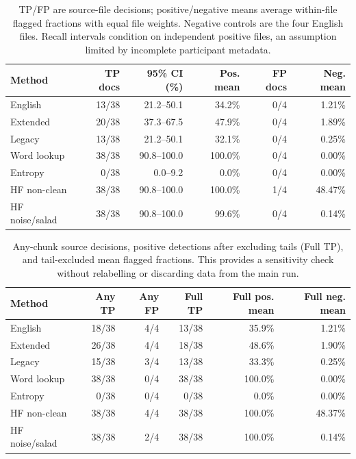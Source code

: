 \documentclass[10pt,a4paper,twocolumn]{article}
\begin{document}
\begin{table}[htbp]
\centering
\small
\caption{TP/FP are source-file decisions; positive/negative means average
within-file flagged fractions with equal file weights. Negative controls
are the four English files. Recall intervals condition on independent
positive files, an assumption limited by incomplete participant
metadata.}
\begin{tabular}{@{}lrrrrr@{}}
\toprule
Method & TP docs & 95\% CI (\%) & Pos. mean & FP docs & Neg. mean \\
\midrule
English & 13/38 & 21.2--50.1 & 34.2\% & 0/4 & 1.21\% \\
Extended & 20/38 & 37.3--67.5 & 47.9\% & 0/4 & 1.89\% \\
Legacy & 13/38 & 21.2--50.1 & 32.1\% & 0/4 & 0.25\% \\
Word lookup & 38/38 & 90.8--100.0 & 100.0\% & 0/4 & 0.00\% \\
Entropy & 0/38 & 0.0--9.2 & 0.0\% & 0/4 & 0.00\% \\
HF non-clean & 38/38 & 90.8--100.0 & 100.0\% & 1/4 & 48.47\% \\
HF noise/salad & 38/38 & 90.8--100.0 & 99.6\% & 0/4 & 0.14\% \\
\bottomrule
\end{tabular}
\end{table}

\begin{table}[htbp]
\centering
\small
\caption{Any-chunk source decisions, positive detections after excluding tails
(Full TP), and tail-excluded mean flagged fractions. This provides a
sensitivity check without relabelling or discarding data from the main
run.}
\begin{tabular}{@{}lrrrrr@{}}
\toprule
Method & Any TP & Any FP & Full TP & Full pos. mean & Full neg. mean \\
\midrule
English & 18/38 & 4/4 & 13/38 & 35.9\% & 1.21\% \\
Extended & 26/38 & 4/4 & 18/38 & 48.6\% & 1.90\% \\
Legacy & 15/38 & 3/4 & 13/38 & 33.3\% & 0.25\% \\
Word lookup & 38/38 & 0/4 & 38/38 & 100.0\% & 0.00\% \\
Entropy & 0/38 & 0/4 & 0/38 & 0.0\% & 0.00\% \\
HF non-clean & 38/38 & 4/4 & 38/38 & 100.0\% & 48.37\% \\
HF noise/salad & 38/38 & 2/4 & 38/38 & 100.0\% & 0.14\% \\
\bottomrule
\end{tabular}
\end{table}
\end{document}
